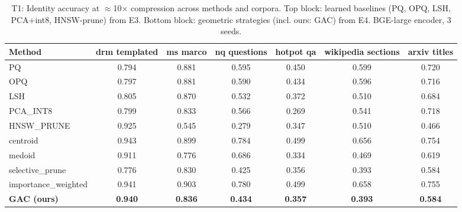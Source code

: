 \begin{table}[t]
\centering
\small
\caption{T1: Identity accuracy at $\approx$10$\times$ compression across methods and corpora. Top block: learned baselines (PQ, OPQ, LSH, PCA+int8, HNSW-prune) from E3. Bottom block: geometric strategies (incl. ours: \textsc{GAC}) from E4. BGE-large encoder, 3 seeds.}
\label{tab:t1}
\begin{tabular}{lcccccc}
\toprule
Method & drm templated & ms marco & nq questions & hotpot qa & wikipedia sections & arxiv titles \\
\midrule
PQ & 0.794 & 0.881 & 0.595 & 0.450 & 0.599 & 0.720 \\
OPQ & 0.797 & 0.881 & 0.590 & 0.434 & 0.596 & 0.716 \\
LSH & 0.805 & 0.870 & 0.532 & 0.372 & 0.510 & 0.684 \\
PCA\_INT8 & 0.799 & 0.833 & 0.566 & 0.269 & 0.541 & 0.718 \\
HNSW\_PRUNE & 0.925 & 0.545 & 0.279 & 0.347 & 0.510 & 0.466 \\
\midrule
centroid & 0.943 & 0.899 & 0.784 & 0.499 & 0.656 & 0.754 \\
medoid & 0.911 & 0.776 & 0.686 & 0.334 & 0.469 & 0.619 \\
selective\_prune & 0.776 & 0.830 & 0.425 & 0.356 & 0.393 & 0.584 \\
importance\_weighted & 0.941 & 0.903 & 0.780 & 0.499 & 0.658 & 0.755 \\
\textbf{GAC (ours)} & \textbf{0.940} & \textbf{0.836} & \textbf{0.434} & \textbf{0.357} & \textbf{0.393} & \textbf{0.584} \\
\bottomrule
\end{tabular}
\end{table}
